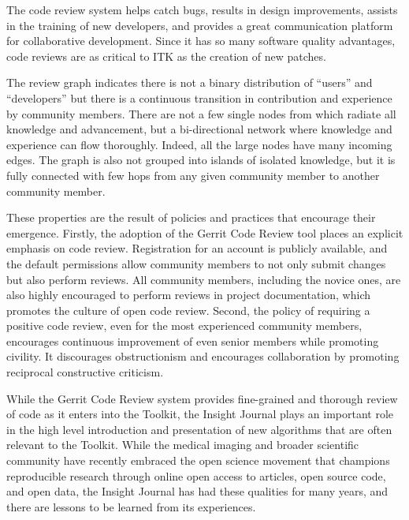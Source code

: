 \documentclass{frontiersENG} %
\begin{document}
The code review system helps catch bugs, results in design improvements,
assists in the training of new developers, and provides a great communication
platform for collaborative development. Since it has so many software quality
advantages, code reviews are as critical to ITK as the creation of new patches.

The review graph indicates there is not a binary distribution of ``users'' and
``developers'' but there is a continuous transition in contribution and experience
by community members. There are not a few single nodes from which radiate all
knowledge and advancement, but a bi-directional network where knowledge and
experience can flow thoroughly.  Indeed, all the large nodes have many
incoming edges. The graph is also not grouped into islands of
isolated knowledge, but it is fully connected with few hops from any given
community member to another community member.

These properties are the result of policies and practices that encourage their
emergence. Firstly, the adoption of the Gerrit Code Review tool places an
explicit emphasis on code review.  Registration for an account is publicly
available, and the default permissions allow community
members to not only submit changes but also perform reviews. All community
members, including the novice ones, are also highly encouraged to perform
reviews in project documentation, which promotes the culture of open code
review. Second, the policy of requiring a positive code review, even for the
most experienced community members, encourages continuous improvement of even
senior members while promoting civility. It discourages obstructionism and
encourages collaboration by promoting reciprocal constructive criticism.

While the Gerrit Code Review system provides fine-grained and thorough review
of code as it enters into the Toolkit, the Insight Journal plays an important
role in the high level introduction and presentation of new algorithms that
are often relevant to the Toolkit. While the medical imaging and broader
scientific community have recently embraced the open science movement that
champions reproducible research through online open access to articles, open
source code, and open data, the Insight Journal has had these qualities for
many years, and there are lessons to be learned from its experiences.
\end{document}
